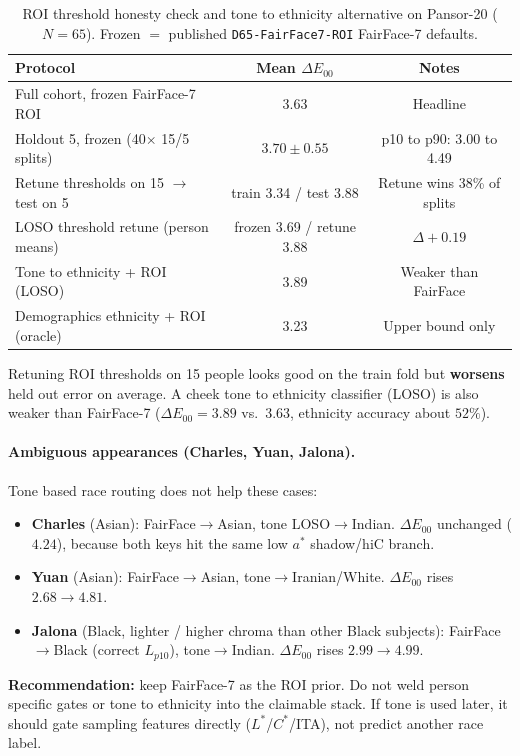 \documentclass[11pt]{article}
\newcommand{\deee}{\ensuremath{\Delta E_{00}}}
\newcommand{\pipename}{\texttt{D65-FairFace7-ROI}}
\begin{document}
\begin{table}[t]
\centering
\caption{ROI threshold honesty check and tone to ethnicity alternative on Pansor-20 ($N=65$).
Frozen $=$ published \pipename{} FairFace-7 defaults.}
\label{tab:honesty}
\begin{tabular}{@{}lcc@{}}
\toprule
Protocol & Mean $\deee$ & Notes \\
\midrule
Full cohort, frozen FairFace-7 ROI & 3.63 & Headline \\
Holdout 5, frozen (40$\times$ 15/5 splits) & $3.70\pm0.55$ & p10 to p90: 3.00 to 4.49 \\
Retune thresholds on 15 $\to$ test on 5 & train 3.34 / test 3.88 & Retune wins 38\% of splits \\
LOSO threshold retune (person means) & frozen 3.69 / retune 3.88 & $\Delta{+}0.19$ \\
Tone to ethnicity + ROI (LOSO) & 3.89 & Weaker than FairFace \\
Demographics ethnicity + ROI (oracle) & 3.23 & Upper bound only \\
\bottomrule
\end{tabular}
\end{table}

Retuning ROI thresholds on 15 people looks good on the train fold but \textbf{worsens} held out error on average.
A cheek tone to ethnicity classifier (LOSO) is also weaker than FairFace-7 ($\deee=\num{3.89}$ vs.\ $\num{3.63}$, ethnicity accuracy about $52\%$).

\paragraph{Ambiguous appearances (Charles, Yuan, Jalona).}
Tone based race routing does not help these cases:
\begin{itemize}[leftmargin=*,itemsep=2pt]
  \item \textbf{Charles} (Asian): FairFace$\to$Asian, tone LOSO$\to$Indian. $\deee$ unchanged ($4.24$), because both keys hit the same low $a^*$ shadow/hiC branch.
  \item \textbf{Yuan} (Asian): FairFace$\to$Asian, tone$\to$Iranian/White. $\deee$ rises $2.68\to4.81$.
  \item \textbf{Jalona} (Black, lighter / higher chroma than other Black subjects): FairFace$\to$Black (correct $L_{p10}$), tone$\to$Indian. $\deee$ rises $2.99\to4.99$.
\end{itemize}
\textbf{Recommendation:} keep FairFace-7 as the ROI prior. Do not weld person specific gates or tone to ethnicity into the claimable stack.
If tone is used later, it should gate sampling features directly ($L^*$/$C^*$/ITA), not predict another race label.
\end{document}
